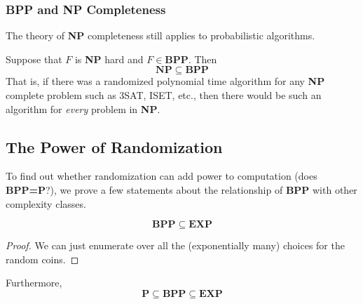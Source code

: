   \subsubsection{BPP and NP Completeness}
  The theory of \textbf{NP} completeness still applies to probabilistic algorithms. 

  \begin{theorem}
  Suppose that $F$ is \textbf{NP} hard and $F \in \mathbf{BPP}$. Then 
  \[\mathbf{NP \subseteq BPP}\]
  That is, if there was a randomized polynomial time algorithm for any \textbf{NP} complete problem such as 3SAT, ISET, etc., then there would be such an algorithm for \textit{every} problem in \textbf{NP}. 
  \end{theorem}

  \subsection{The Power of Randomization}
  To find out whether randomization can add power to computation (does \textbf{BPP=P}?), we prove a few statements about the relationship of \textbf{BPP} with other complexity classes. 

  \begin{theorem}
  \[\mathbf{BPP \subseteq EXP}\]
  \end{theorem}
  \begin{proof}
  We can just enumerate over all the (exponentially many) choices for the random coins. 
  \end{proof}

  Furthermore, 
  \[\mathbf{P \subseteq BPP \subseteq EXP}\]

